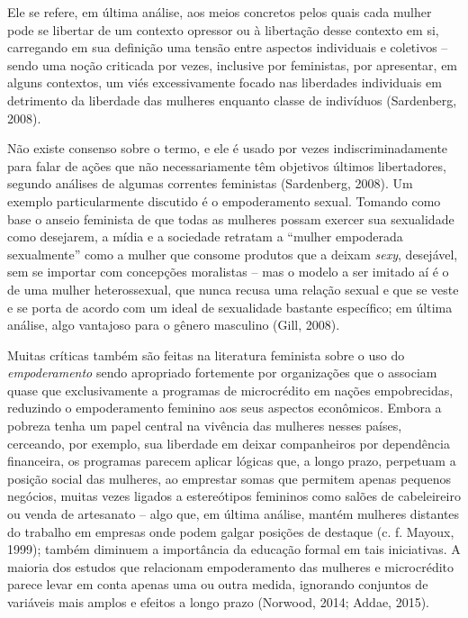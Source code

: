 Ele se refere, em última análise, aos meios concretos pelos quais cada mulher pode se libertar de um contexto opressor ou à libertação desse contexto em si, carregando em sua definição uma tensão entre aspectos individuais e coletivos – sendo uma noção criticada por vezes, inclusive por feministas, por apresentar, em alguns contextos, um viés excessivamente focado nas liberdades individuais em detrimento da liberdade das mulheres enquanto classe de indivíduos (Sardenberg, 2008). 

Não existe consenso sobre o termo, e ele é usado por vezes indiscriminadamente para falar de ações que não necessariamente têm objetivos últimos libertadores, segundo análises de algumas correntes feministas (Sardenberg, 2008). Um exemplo particularmente discutido é o empoderamento sexual. Tomando como base o anseio feminista de que todas as mulheres possam exercer sua sexualidade como desejarem, a mídia e a sociedade retratam a ``mulher empoderada sexualmente'' como a mulher que consome produtos que a deixam \textit{sexy}, desejável, sem se importar com concepções moralistas – mas o modelo a ser imitado aí é o de uma mulher heterossexual, que nunca recusa uma relação sexual e que se veste e se porta de acordo com um ideal de sexualidade bastante específico; em última análise, algo vantajoso para o gênero masculino (Gill, 2008).

Muitas críticas também são feitas na literatura feminista sobre o uso do \textit{empoderamento} sendo apropriado fortemente por organizações que o associam quase que exclusivamente a programas de microcrédito em nações empobrecidas, reduzindo o empoderamento feminino aos seus aspectos econômicos. Embora a pobreza tenha um papel central na vivência das mulheres nesses países, cerceando, por exemplo, sua liberdade em deixar companheiros por dependência financeira, os programas parecem aplicar lógicas que, a longo prazo, perpetuam a posição social das mulheres, ao emprestar somas que permitem apenas pequenos negócios, muitas vezes ligados a estereótipos femininos como salões de cabeleireiro ou venda de artesanato – algo que, em última análise, mantém mulheres distantes do trabalho em empresas onde podem galgar posições de destaque (c. f. Mayoux, 1999); também diminuem a importância da educação formal em tais iniciativas. A maioria dos estudos que relacionam empoderamento das mulheres e microcrédito parece levar em conta apenas uma ou outra medida, ignorando conjuntos de variáveis mais amplos e efeitos a longo prazo (Norwood, 2014; Addae, 2015).

